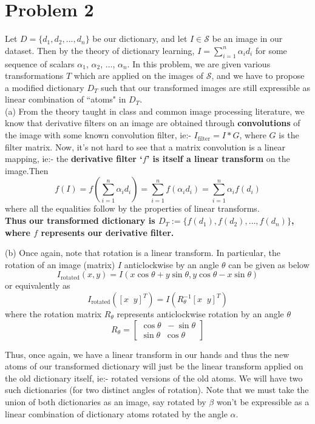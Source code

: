 \documentclass[a4paper,14pt]{article}
\numberwithin{definition}{section}
\numberwithin{mytheorem}{subsection}
\begin{document}
\section{Problem 2}
Let $D = \{d_1, d_2, ..., d_n\}$ be our dictionary, and let $I\in\mathcal{S}$ be an image in our dataset. Then by the theory of dictionary learning, $I = \sum^{n}_{i = 1}\alpha_id_i$ for some sequence of scalars $\alpha_1$, $\alpha_2$, $\hdots$, $\alpha_n$. In this problem, we are given various transformations $T$ which are applied on the images of $\mathcal{S}$, and we have to propose a modified dictionary $D_T$ such that our transformed images are still expressible as linear combination of ``atoms" in $D_T$.\\

(a) From the theory taught in class and common image processing literature, we know that derivative filters on an image are obtained through \textbf{convolutions} of the image with some known convolution filter, ie:- $I_{\mathrm{filter}} = I * G$, where $G$ is the filter matrix. Now, it's not hard to see that a matrix convolution is a linear mapping, ie:- the \textbf{derivative filter `$f$' is itself a linear transform} on the image.Then 
$$f(I) = f(\sum^{n}_{i = 1}\alpha_id_i) = \sum^{n}_{i = 1}f(\alpha_id_i) = \sum^{n}_{i = 1}\alpha_if(d_i)$$
where all the equalities follow by the properties of linear transforms.\\
\textbf{Thus our transformed dictionary is $D_T := \{f(d_1), f(d_2), \hdots, f(d_n)\}$, where $f$ represents our derivative filter.}


(b) Once again, note that rotation is a linear transform. In particular, the rotation of an image (matrix) $I$ anticlockwise by an angle $\theta$ can be given as below
$$I_{\mathrm{rotated}}(x, y) = I(x\cos\theta+y\sin\theta, y\cos\theta-x\sin\theta)$$
or equivalently as
$$I_{\mathrm{rotated}}([x\;\;y]^T) = I(R_{\theta}^{-1}[x\;\;y]^T)$$
where the rotation matrix $R_{\theta}$ represents anticlockwise rotation by an angle $\theta$
$$R_{\theta} = \begin{bmatrix}
    \cos\theta \;\; -\sin\theta\\
\sin\theta \;\; \cos\theta
\end{bmatrix}$$ 

Thus, once again, we have a linear transform in our hands and thus the new atoms of our transformed dictionary will just be the linear transform applied on the old dictionary itself, ie:- rotated versions of the old atoms. We will have two such dictionaries (for two distinct angles of rotation). Note that we must take the union of both dictionaries as an image, say rotated by $\beta$ won't be expressible as a linear combination of dictionary atoms rotated by the angle $\alpha$.
\end{document}
